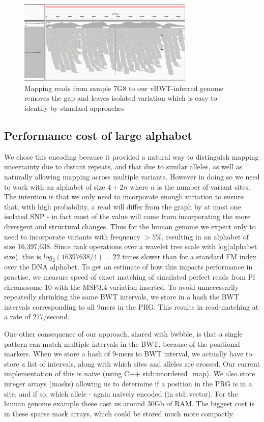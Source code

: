 \documentclass[runningheads,a4paper]{llncs}
\begin{document}
\begin{figure}
\centering
\includegraphics[height=4cm]{7G8_to_inf_ref_pileup.png}
\caption{Mapping reads from sample 7G8 to our vBWT-inferred genome removes the gap and leaves isolated variation which is easy to identify by standard approaches}
\label{fig:example}
\end{figure}




\subsection{Performance cost of large alphabet}
We chose this encoding because it provided a natural way to distinguish mapping uncertainty due to distant repeats, and that due to similar alleles, as well as naturally allowing mapping across multiple variants. However in doing so we need to work with an alphabet of size $4+2n$ where $n$ is the number of variant sites. The intention is that we only need to incorporate enough variation to ensure that, with high probability, a read will differ from the graph by at most one isolated SNP - in fact most of the value will come from incorporating the more divergent and structural changes. Thus for the human genome we expect only to need to incorporate variants with frequency $>5\%$, resulting in an alphabet of size 16,397,638. Since rank operations over a wavelet tree scale with log(alphabet size), this is $log_2(16397638/4)=22$ times slower than for a standard FM index over the DNA alphabet.  To get an estimate of how this impacts performance in practise, we measure speed of exact matching of simulated perfect reads from Pf chromosome 10 with the MSP3.4 variation inserted. To avoid unnecessarily repeatedly shrinking the same BWT intervals, we store  in a hash the  BWT intervals corresponding to all 9mers in the PRG. This results in read-matching at a rate of 277/second.

One other consequence of our approach, shared with bwbble, is that a single pattern can match multiple intervals in the BWT, because of the positional markers. When we store a hash of 9-mers to BWT interval, we actually have to store a list of intervals, along with which sites and alleles are crossed. Our current implementation of this is naive (using C++ std::unordered\_map). We also store integer arrays (masks) allowing us to determine if a position in the PRG is in a site, and if so, which allele - again naively encoded (in std::vector). For the human genome example these cost us around 30Gb of RAM. The biggest cost is in these sparse mask arrays, which could be stored much more compactly.
\end{document}
